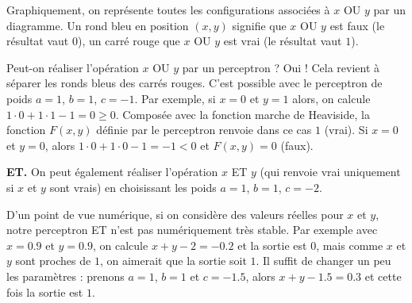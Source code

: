 \documentclass[11pt,class=report,crop=false]{standalone}
\begin{document}
Graphiquement, on représente toutes les configurations associées à \og{}$x$ OU $y$\fg{} par un diagramme. Un rond bleu en position $(x,y)$ signifie que \og{}$x$ OU $y$\fg{} est faux (le résultat vaut $0$), un carré rouge que \og{}$x$ OU $y$\fg{} est vrai (le résultat vaut $1$).



Peut-on réaliser l'opération \og{}$x$ OU $y$\fg{} par un perceptron ? 
Oui ! Cela revient à séparer les ronds bleus des carrés rouges.
C'est possible avec le perceptron de poids $a=1$, $b=1$, $c=-1$.
Par exemple, si $x=0$ et $y=1$ alors, on calcule $1\cdot0+1\cdot1-1 = 0 \ge0$. Composée avec la fonction marche de Heaviside, la fonction $F(x,y)$
définie par le perceptron renvoie dans ce cas $1$ (\og{}vrai\fg{}).
Si $x=0$ et $y=0$, alors $1\cdot0+1\cdot0-1 = -1 <0$ et $F(x,y)=0$ (\og{}faux\fg{}).

\begin{center}
\begin{minipage}{0.35\textwidth}
\end{minipage}
\begin{minipage}{0.45\textwidth}
\end{minipage}
\end{center}


\bigskip
\textbf{ET.}
On peut également réaliser l'opération \og{}$x$ ET $y$\fg{} (qui renvoie \og{}vrai\fg{} uniquement si $x$ et $y$ sont vrais) en choisissant les poids $a=1$, $b=1$, $c=-2$.

\begin{center}
\begin{minipage}{0.35\textwidth}
\end{minipage}
\begin{minipage}{0.45\textwidth}
\end{minipage}
\end{center}

\begin{remarque*}
D'un point de vue numérique, si on considère des valeurs réelles pour $x$ et $y$, notre perceptron \og{}ET\fg{} n'est pas numériquement très stable.
Par exemple avec $x=0.9$ et $y=0.9$, on calcule $x+y-2=-0.2$ et la sortie est $0$, mais comme $x$ et $y$ sont proches de $1$, on aimerait que la sortie soit $1$.
Il suffit de changer un peu les paramètres : prenons $a=1$, $b=1$ et $c=-1.5$, alors $x+y-1.5=0.3$ et cette fois la sortie est $1$.
\end{remarque*}
\end{document}
